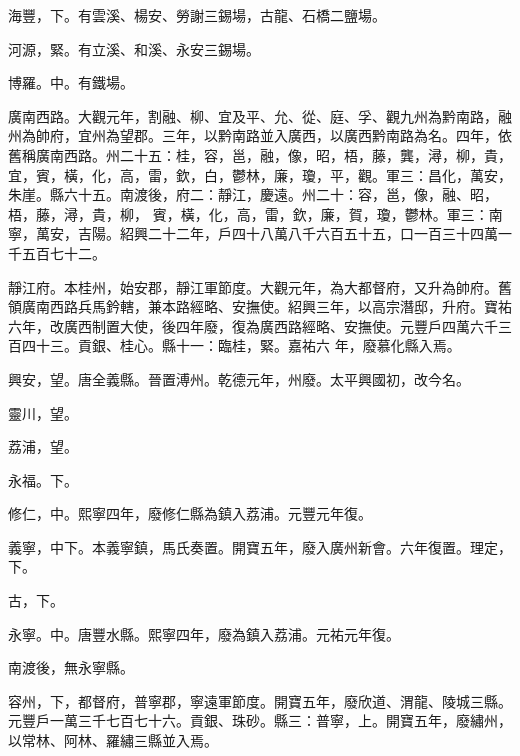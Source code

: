 \begin{pinyinscope}
 海豐，下。有雲溪、楊安、勞謝三錫場，古龍、石橋二鹽場。



 河源，緊。有立溪、和溪、永安三錫場。



 博羅。中。有鐵場。



 廣南西路。大觀元年，割融、柳、宜及平、允、從、庭、孚、觀九州為黔南路，融州為帥府，宜州為望郡。三年，以黔南路並入廣西，以廣西黔南路為名。四年，依舊稱廣南西路。州二十五：桂，容，邕，融，像，昭，梧，藤，龔，潯，柳，貴，宜，賓，橫，化，高，雷，欽，白，鬱林，廉，瓊，平，觀。軍三：昌化，萬安，朱崖。縣六十五。南渡後，府二：靜江，慶遠。州二十：容，邕，像，融、昭，梧，藤，潯，貴，柳，
 賓，橫，化，高，雷，欽，廉，賀，瓊，鬱林。軍三：南寧，萬安，吉陽。紹興二十二年，戶四十八萬八千六百五十五，口一百三十四萬一千五百七十二。



 靜江府。本桂州，始安郡，靜江軍節度。大觀元年，為大都督府，又升為帥府。舊領廣南西路兵馬鈐轄，兼本路經略、安撫使。紹興三年，以高宗潛邸，升府。寶祐六年，改廣西制置大使，後四年廢，復為廣西路經略、安撫使。元豐戶四萬六千三百四十三。貢銀、桂心。縣十一：臨桂，緊。嘉祐六
 年，廢慕化縣入焉。



 興安，望。唐全義縣。晉置溥州。乾德元年，州廢。太平興國初，改今名。



 靈川，望。



 荔浦，望。



 永福。下。



 修仁，中。熙寧四年，廢修仁縣為鎮入荔浦。元豐元年復。



 義寧，中下。本義寧鎮，馬氏奏置。開寶五年，廢入廣州新會。六年復置。理定，下。



 古，下。



 永寧。中。唐豐水縣。熙寧四年，廢為鎮入荔浦。元祐元年復。



 南渡後，無永寧縣。



 容州，下，都督府，普寧郡，寧遠軍節度。開寶五年，廢欣道、渭龍、陵城三縣。元豐戶一萬三千七百七十六。貢銀、珠砂。縣三：普寧，上。開寶五年，廢繡州，以常林、阿林、羅繡三縣並入焉。




\end{pinyinscope}
